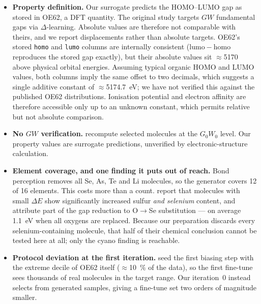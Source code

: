 \documentclass[runningheads]{llncs}
\begin{document}
\begin{itemize}
  \item \textbf{Property definition.} Our surrogate predicts the
        HOMO--LUMO gap as stored in OE62, a DFT quantity. The original
        study targets $GW$ fundamental gaps via $\Delta$-learning.
        Absolute values are therefore not comparable with theirs, and we
        report displacements rather than absolute targets. OE62's stored
        \texttt{homo} and \texttt{lumo} columns are internally
        consistent ($\mathrm{lumo}-\mathrm{homo}$ reproduces the stored
        gap exactly), but their absolute values sit $\approx$\num{5170}
        above physical orbital energies. Assuming typical organic
        HOMO and LUMO values, both columns imply the same offset to
        two decimals, which suggests a single additive constant of
        $\approx$\SI{5174.7}{\electronvolt}; we have not verified this
        against the published OE62 distributions. Ionisation potential
        and electron affinity are therefore accessible only up to an
        unknown constant, which permits relative but not absolute
        comparison.
  \item \textbf{No $GW$ verification.} \cite{westermayr2022} recompute
        selected molecules at the $G_0W_0$ level. Our property values are
        surrogate predictions, unverified by electronic-structure
        calculation.
  \item \textbf{Element coverage, and one finding it puts out of reach.}
        Bond perception removes all Se, As, Te and Li molecules, so the
        generator covers 12 of 16 elements. This costs more than a count.
        \cite{westermayr2022} report that molecules with small $\Delta E$
        show significantly increased sulfur \emph{and selenium} content,
        and attribute part of the gap reduction to O$\rightarrow$Se
        substitution --- on average \SI{1.1}{\electronvolt} when all
        oxygens are replaced. Because our preparation discards every
        selenium-containing molecule, that half of their chemical
        conclusion cannot be tested here at all; only the cyano finding
        is reachable.
  \item \textbf{Protocol deviation at the first iteration.}
        \cite{westermayr2022} seed the first biasing step with the
        extreme decile of OE62 itself ($\approx$\SI{10}{\percent} of the
        data), so the first fine-tune sees thousands of real molecules in
        the target range. Our iteration~0 instead selects from generated
        samples, giving a fine-tune set two orders of magnitude smaller.

\end{itemize}
\end{document}
